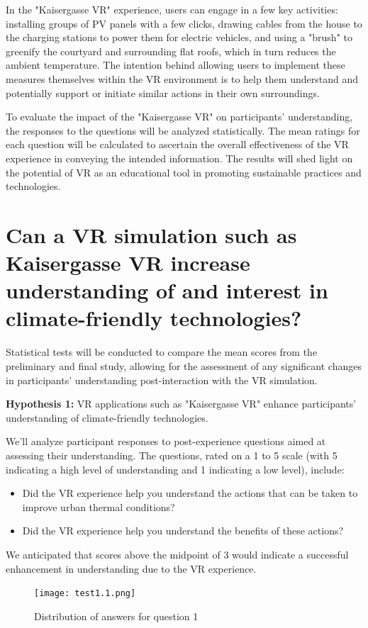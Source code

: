 \documentclass[draft, final]{vutinfth} %
\begin{document}
In the "Kaisergasse VR" experience, users can engage in a few key activities: installing groups of PV panels with a few clicks, drawing cables from the house to the charging stations to power them for electric vehicles, and using a "brush" to greenify the courtyard and surrounding flat roofs, which in turn reduces the ambient temperature. The intention behind allowing users to implement these measures themselves within the VR environment is to help them understand and potentially support or initiate similar actions in their own surroundings.

To evaluate the impact of the "Kaisergasse VR" on participants' understanding, the responses to the questions will be analyzed statistically. The mean ratings for each question will be calculated to ascertain the overall effectiveness of the VR experience in conveying the intended information. The results will shed light on the potential of VR as an educational tool in promoting sustainable practices and technologies.

\section{Can a VR simulation such as Kaisergasse VR increase understanding of and interest in climate-friendly technologies?}
Statistical tests will be conducted to compare the mean scores from the preliminary and final study, allowing for the assessment of any significant changes in participants' understanding post-interaction with the VR simulation.

\textbf{Hypothesis 1:} VR applications such as "Kaisergasse VR" enhance participants' understanding of climate-friendly technologies.

We'll analyze participant responses to post-experience questions aimed at assessing their understanding. The questions, rated on a 1 to 5 scale (with 5 indicating a high level of understanding and 1 indicating a low level), include:
\begin{itemize}
    \item Did the VR experience help you understand the actions that can be taken to improve urban thermal conditions?
    \item Did the VR experience help you understand the benefits of these actions?
\end{itemize}
We anticipated that scores above the midpoint of 3 would indicate a successful enhancement in understanding due to the VR experience.

\begin{figure}[h]
  \centering
  \texttt{[image: test1.1.png]}
  \caption[Distribution of answers for question 1.1]{Distribution of answers for question 1}
  \label{fig:analysis-image1}
\end{figure}
\end{document}
